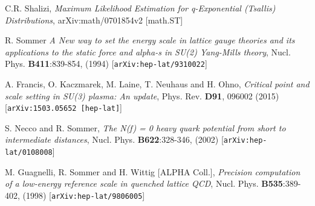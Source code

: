 \documentclass[aps,prd,twocolumn,showpacs,superscriptaddress,groupedaddress]{revtex4}  %
\begin{document}
\begin{thebibliography}{99}
C.R. Shalizi,
\emph{Maximum Likelihood Estimation for q-Exponential (Tsallis) Distributions},
arXiv:math/0701854v2 [math.ST]

R. Sommer
\emph{A New way to set the energy scale in lattice gauge
                        theories and its applications to the static force and
                        alpha-s in SU(2) Yang-Mills theory},
Nucl. Phys. {\bf B411}:839-854, (1994)
[{\tt arXiv:hep-lat/9310022}]

A. Francis, O. Kaczmarek, M. Laine, T. Neuhaus and H. Ohno,
\emph{Critical point and scale setting in SU(3) plasma: An
                        update},
Phys. Rev. {\bf D91}, 096002 (2015)
[{\tt  	arXiv:1503.05652 [hep-lat]}]

S. Necco and R. Sommer,
\emph{The N(f) = 0 heavy quark potential from short to
                        intermediate distances},
Nucl. Phys. {\bf B622}:328-346, (2002)
[{\tt arXiv:hep-lat/0108008}]

M. Guagnelli, R. Sommer and H. Wittig [ALPHA Coll.],
\emph{Precision computation of a low-energy reference scale in
                        quenched lattice QCD},
Nucl. Phys. {\bf B535}:389-402, (1998)
[{\tt  	arXiv:hep-lat/9806005}]

\end{thebibliography}
\end{document}
